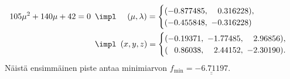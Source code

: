 \begin{align*}
105\mu^2+140\mu+42=0\,\ 
                 &\impl\quad\ (\mu,\lambda)=\begin{cases}
                                         (-0.877485, \ \phantom{-}0.316228), \\
                                         (-0.455848, \ -0.316228)
                                         \end{cases} \\
                 &\impl\,\ (x,y,z)=\begin{cases}
                                   (-0.19371, \ -1.77485, \ \phantom{-}2.96856), \\
                                   (\phantom{-}0.86038, \ \phantom{-}2.44152, \ -2.30190).
                                   \end{cases}
\end{align*}
Näistä ensimmäinen piste antaa minimiarvon $f_{\min}=\underline{\underline{-6.71197}}$.
\loppu

